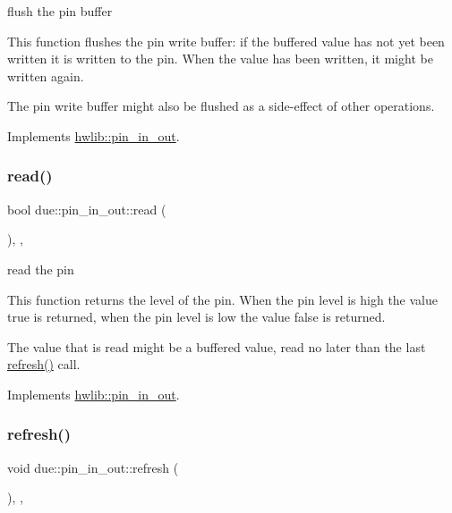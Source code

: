 flush the pin buffer

This function flushes the pin write buffer\+: if the buffered value has not yet been written it is written to the pin. When the value has been written, it might be written again.

The pin write buffer might also be flushed as a side-\/effect of other operations. 

Implements \hyperlink{classhwlib_1_1pin__in__out_a5207c9e30f0c88e4c052952397c2da88}{hwlib\+::pin\+\_\+in\+\_\+out}.

\mbox{\label{classdue_1_1pin__in__out_a864093a15647637d71ecd8ded27ba4f8}} 
\subsubsection{\texorpdfstring{read()}{read()}}
{\footnotesize\ttfamily bool due\+::pin\+\_\+in\+\_\+out\+::read (\begin{DoxyParamCaption}{ }\end{DoxyParamCaption})\hspace{0.3cm}{\ttfamily [inline]}, {\ttfamily [override]}, {\ttfamily [virtual]}}

read the pin

This function returns the level of the pin. When the pin level is high the value true is returned, when the pin level is low the value false is returned.

The value that is read might be a buffered value, read no later than the last \hyperlink{classdue_1_1pin__in__out_ab9fc7183f352e0b19004779803cd5950}{refresh()} call. 

Implements \hyperlink{classhwlib_1_1pin__in__out_a5caebc7ab9fe49b7e020b89f0a2cf892}{hwlib\+::pin\+\_\+in\+\_\+out}.

\mbox{\label{classdue_1_1pin__in__out_ab9fc7183f352e0b19004779803cd5950}} 
\subsubsection{\texorpdfstring{refresh()}{refresh()}}
{\footnotesize\ttfamily void due\+::pin\+\_\+in\+\_\+out\+::refresh (\begin{DoxyParamCaption}{ }\end{DoxyParamCaption})\hspace{0.3cm}{\ttfamily [inline]}, {\ttfamily [override]}, {\ttfamily [virtual]}}

